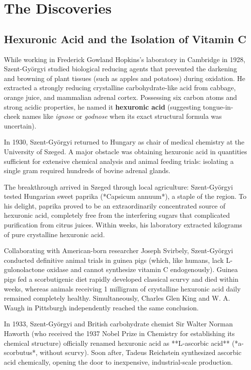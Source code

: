 \section{The Discoveries}

\subsection{Hexuronic Acid and the Isolation of Vitamin C}

While working in Frederick Gowland Hopkins's laboratory in Cambridge in 1928, Szent-Györgyi studied biological reducing agents that prevented the darkening and browning of plant tissues (such as apples and potatoes) during oxidation. He extracted a strongly reducing crystalline carbohydrate-like acid from cabbage, orange juice, and mammalian adrenal cortex. Possessing six carbon atoms and strong acidic properties, he named it \textbf{hexuronic acid} (suggesting tongue-in-cheek names like \emph{ignose} or \emph{godnose} when its exact structural formula was uncertain).

In 1930, Szent-Györgyi returned to Hungary as chair of medical chemistry at the University of Szeged. A major obstacle was obtaining hexuronic acid in quantities sufficient for extensive chemical analysis and animal feeding trials: isolating a single gram required hundreds of bovine adrenal glands. 

The breakthrough arrived in Szeged through local agriculture: Szent-Györgyi tested Hungarian sweet paprika (*Capsicum annuum*), a staple of the region. To his delight, paprika proved to be an extraordinarily concentrated source of hexuronic acid, completely free from the interfering sugars that complicated purification from citrus juices. Within weeks, his laboratory extracted kilograms of pure crystalline hexuronic acid.

Collaborating with American-born researcher Joseph Svirbely, Szent-Györgyi conducted definitive animal trials in guinea pigs (which, like humans, lack L-gulonolactone oxidase and cannot synthesize vitamin C endogenously). Guinea pigs fed a scorbutigenic diet rapidly developed classical scurvy and died within weeks, whereas animals receiving 1 milligram of crystalline hexuronic acid daily remained completely healthy. Simultaneously, Charles Glen King and W. A. Waugh in Pittsburgh independently reached the same conclusion. 

In 1933, Szent-Györgyi and British carbohydrate chemist Sir Walter Norman Haworth (who received the 1937 Nobel Prize in Chemistry for establishing its chemical structure) officially renamed hexuronic acid as **L-ascorbic acid** (*a-scorbutus*, without scurvy). Soon after, Tadeus Reichstein synthesized ascorbic acid chemically, opening the door to inexpensive, industrial-scale production.

